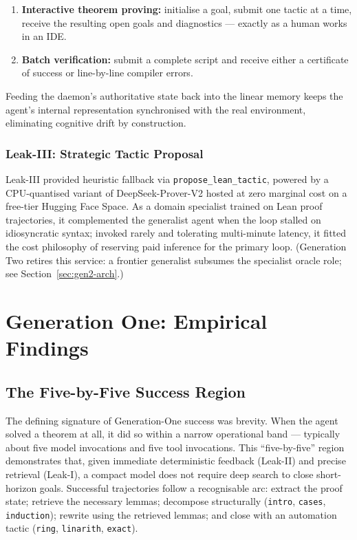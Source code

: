 \documentclass[12pt, a4paper]{article}
\begin{document}
\begin{enumerate}[leftmargin=*]
  \item \textbf{Interactive theorem proving:} initialise a goal, submit one
    tactic at a time, receive the resulting open goals and diagnostics ---
    exactly as a human works in an IDE.
  \item \textbf{Batch verification:} submit a complete script and receive
    either a certificate of success or line-by-line compiler errors.
\end{enumerate}

Feeding the daemon's authoritative state back into the linear memory keeps
the agent's internal representation synchronised with the real environment,
eliminating cognitive drift by construction.

\subsubsection{Leak-III: Strategic Tactic Proposal}

Leak-III provided heuristic fallback via \texttt{propose\_lean\_tactic},
powered by a CPU-quantised variant of DeepSeek-Prover-V2 hosted at zero
marginal cost on a free-tier Hugging Face Space. As a domain specialist
trained on Lean proof trajectories, it complemented the generalist agent
when the loop stalled on idiosyncratic syntax; invoked rarely and tolerating
multi-minute latency, it fitted the cost philosophy of reserving paid
inference for the primary loop. (Generation Two retires this service:
a frontier generalist subsumes the specialist oracle role;
see Section~\ref{sec:gen2-arch}.)

\section{Generation One: Empirical Findings}
\label{sec:gen1-results}

\subsection{The Five-by-Five Success Region}

The defining signature of Generation-One success was brevity. When the agent
solved a theorem at all, it did so within a narrow operational band ---
typically about five model invocations and five tool invocations. This
``five-by-five'' region demonstrates that, given immediate deterministic
feedback (Leak-II) and precise retrieval (Leak-I), a compact model does not
require deep search to close short-horizon goals. Successful trajectories
follow a recognisable arc: extract the proof state; retrieve the necessary
lemmas; decompose structurally (\texttt{intro}, \texttt{cases},
\texttt{induction}); rewrite using the retrieved lemmas; and close with an
automation tactic (\texttt{ring}, \texttt{linarith}, \texttt{exact}).
\end{document}
